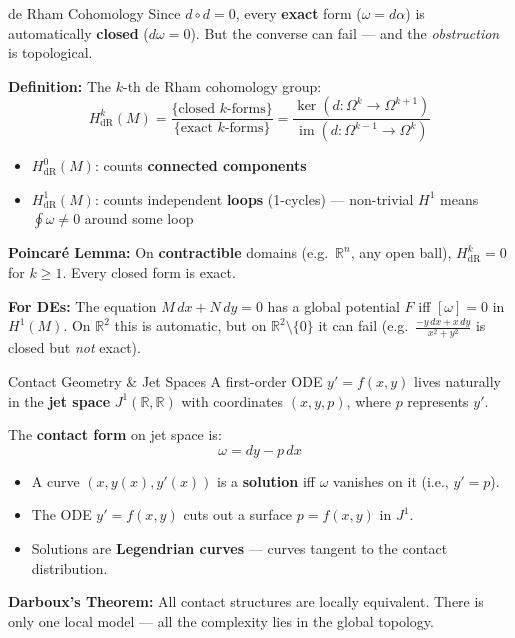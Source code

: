 \begin{frame}{de Rham Cohomology}
Since $d \circ d = 0$, every \textbf{exact} form ($\omega = d\alpha$) is automatically \textbf{closed} ($d\omega = 0$).
But the converse can fail --- and the \emph{obstruction} is topological.

\vspace{0.2cm}
\textbf{Definition:} The $k$-th de Rham cohomology group:
\[
H^k_{\text{dR}}(M) = \frac{\{\text{closed } k\text{-forms}\}}{\{\text{exact } k\text{-forms}\}} = \frac{\ker(d : \Omega^k \to \Omega^{k+1})}{\operatorname{im}(d : \Omega^{k-1} \to \Omega^k)}
\]

\begin{itemize}
    \item $H^0_{\text{dR}}(M)$: counts \textbf{connected components}
    \item $H^1_{\text{dR}}(M)$: counts independent \textbf{loops} (1-cycles) --- non-trivial $H^1$ means $\oint \omega \neq 0$ around some loop
\end{itemize}

\vspace{0.2cm}
\textbf{Poincar\'e Lemma:} On \textbf{contractible} domains (e.g.\ $\mathbb{R}^n$, any open ball), $H^k_{\text{dR}} = 0$ for $k \geq 1$. Every closed form is exact.

\vspace{0.1cm}
\textbf{For DEs:} The equation $M\,dx + N\,dy = 0$ has a global potential $F$ iff $[\omega] = 0$ in $H^1(M)$. On $\mathbb{R}^2$ this is automatic, but on $\mathbb{R}^2 \setminus \{0\}$ it can fail (e.g.\ $\frac{-y\,dx + x\,dy}{x^2+y^2}$ is closed but \emph{not} exact).
\end{frame}


\begin{frame}{Contact Geometry \& Jet Spaces}
A first-order ODE $y' = f(x,y)$ lives naturally in the \textbf{jet space} $J^1(\mathbb{R},\mathbb{R})$ with coordinates $(x, y, p)$, where $p$ represents $y'$.

\vspace{0.3cm}
The \textbf{contact form} on jet space is:
\[
\omega = dy - p\,dx
\]

\begin{itemize}
    \item A curve $(x, y(x), y'(x))$ is a \textbf{solution} iff $\omega$ vanishes on it (i.e., $y' = p$).
    \item The ODE $y' = f(x,y)$ cuts out a surface $p = f(x,y)$ in $J^1$.
    \item Solutions are \textbf{Legendrian curves} --- curves tangent to the contact distribution.
\end{itemize}

\vspace{0.3cm}
\textbf{Darboux's Theorem:} All contact structures are locally equivalent. There is only one local model --- all the complexity lies in the global topology.
\end{frame}


